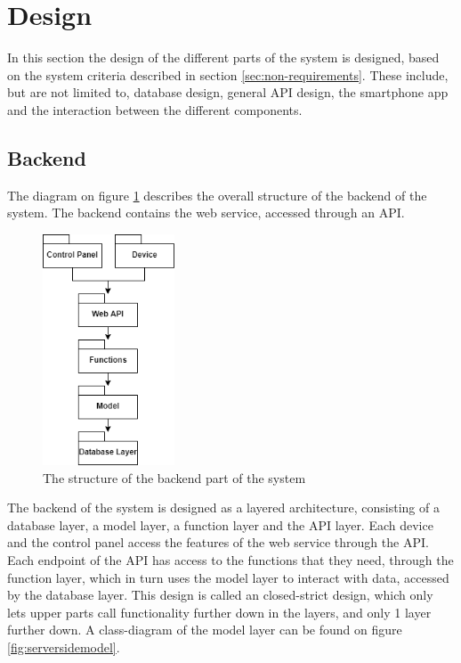 \section{Design}\label{sec:design}
In this section the design of the different parts of the system is designed, based on the system criteria described in section \ref{sec:non-requirements}. These include, but are not limited to, database design, general API design, the smartphone app and the interaction between the different components.

\subsection{Backend}\label{sec:back-end}
The diagram on figure \ref{fig:serversidestructure} describes the overall structure of the backend of the system. The backend contains the web service, accessed through an API.

\begin{figure}[H]
    \centering
    \includegraphics[width=0.35\textwidth]{Figures/serverSide.png}
    \caption{The structure of the backend part of the system}
    \label{fig:serversidestructure}
\end{figure}

The backend of the system is designed as a layered architecture, consisting of a database layer, a model layer, a function layer and the API layer. Each device and the control panel access the features of the web service through the API. Each endpoint of the API has access to the functions that they need, through the function layer, which in turn uses the model layer to interact with data, accessed by the database layer. This design is called an closed-strict design, which only lets upper parts call functionality further down in the layers, and only 1 layer further down. A class-diagram of the model layer can be found on figure \ref{fig:serversidemodel}. 

